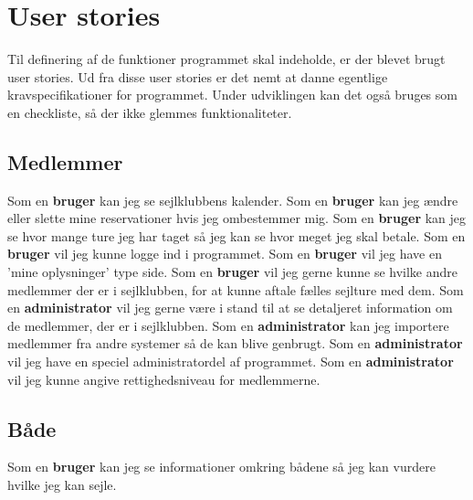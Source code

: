 \chapter{User stories}\label{User_stories}
Til definering af de funktioner programmet skal indeholde, er der blevet brugt user stories.
Ud fra disse user stories er det nemt at danne egentlige kravspecifikationer for programmet. 
Under udviklingen kan det også bruges som en checkliste, så der ikke glemmes funktionaliteter. 

\section{Medlemmer}
Som en \textbf{bruger} kan jeg se sejlklubbens kalender.
\newline
Som en \textbf{bruger} kan jeg ændre eller slette mine reservationer hvis jeg ombestemmer mig.
\newline
Som en \textbf{bruger} kan jeg se hvor mange ture jeg har taget så jeg kan se hvor meget jeg skal betale.
\newline
Som en \textbf{bruger} vil jeg kunne logge ind i programmet.
\newline
Som en \textbf{bruger} vil jeg have en 'mine oplysninger' type side.
\newline
Som en \textbf{bruger} vil jeg gerne kunne se hvilke andre medlemmer der er i sejlklubben, for at kunne aftale fælles sejlture med dem.
\newline
Som en \textbf{administrator} vil jeg gerne være i stand til at se detaljeret information om de medlemmer, der er i sejlklubben.
\newline
Som en \textbf{administrator} kan jeg importere medlemmer fra andre systemer så de kan blive genbrugt.
\newline
Som en \textbf{administrator} vil jeg have en speciel administratordel af programmet.
\newline
Som en \textbf{administrator} vil jeg kunne angive rettighedsniveau for medlemmerne.

\section{Både}

Som en \textbf{bruger} kan jeg se informationer omkring bådene så jeg kan vurdere hvilke jeg kan sejle.

